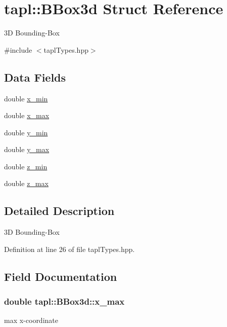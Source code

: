 \hypertarget{structtapl_1_1BBox3d}{}\section{tapl\+:\+:B\+Box3d Struct Reference}
\label{structtapl_1_1BBox3d}


3D Bounding-\/\+Box  




{\ttfamily \#include $<$tapl\+Types.\+hpp$>$}

\subsection*{Data Fields}
\begin{DoxyCompactItemize}
\item 
double \hyperlink{structtapl_1_1BBox3d_a7f28356e5e1f7503770b352c457d4aed}{x\+\_\+min}
\item 
double \hyperlink{structtapl_1_1BBox3d_ae7fd61bfb33a3c5fbc7b531960d7e543}{x\+\_\+max}
\item 
double \hyperlink{structtapl_1_1BBox3d_a63dd683fccb905aa43e3d363c0829581}{y\+\_\+min}
\item 
double \hyperlink{structtapl_1_1BBox3d_ade66b3bf2e0dcf01b790d560826b64e1}{y\+\_\+max}
\item 
double \hyperlink{structtapl_1_1BBox3d_a62b2d92bf15298ad86a7159aadd232ab}{z\+\_\+min}
\item 
double \hyperlink{structtapl_1_1BBox3d_a6b1ff639ba484bdcf6185d53870d623f}{z\+\_\+max}
\end{DoxyCompactItemize}


\subsection{Detailed Description}
3D Bounding-\/\+Box 

Definition at line 26 of file tapl\+Types.\+hpp.



\subsection{Field Documentation}
\subsubsection[{\texorpdfstring{x\+\_\+max}{x_max}}]{\setlength{\rightskip}{0pt plus 5cm}double tapl\+::\+B\+Box3d\+::x\+\_\+max}\hypertarget{structtapl_1_1BBox3d_ae7fd61bfb33a3c5fbc7b531960d7e543}{}\label{structtapl_1_1BBox3d_ae7fd61bfb33a3c5fbc7b531960d7e543}
max x-\/coordinate 

